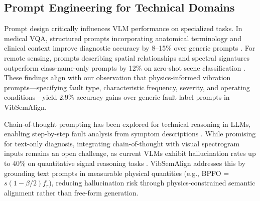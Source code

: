 \subsection{Prompt Engineering for Technical Domains}

Prompt design critically influences VLM performance on specialized tasks. In medical VQA, structured prompts incorporating anatomical terminology and clinical context improve diagnostic accuracy by 8--15\% over generic prompts \cite{li2023llava}. For remote sensing, prompts describing spatial relationships and spectral signatures outperform class-name-only prompts by 12\% on zero-shot scene classification \cite{liu2024remoteclip}. These findings align with our observation that physics-informed vibration prompts—specifying fault type, characteristic frequency, severity, and operating conditions—yield 2.9\% accuracy gains over generic fault-label prompts in VibSemAlign.

Chain-of-thought prompting has been explored for technical reasoning in LLMs, enabling step-by-step fault analysis from symptom descriptions \cite{wei2022chain}. While promising for text-only diagnosis, integrating chain-of-thought with visual spectrogram inputs remains an open challenge, as current VLMs exhibit hallucination rates up to 40\% on quantitative signal reasoning tasks \cite{liu2024faultgpt}. VibSemAlign addresses this by grounding text prompts in measurable physical quantities (e.g., BPFO = $s(1-\beta/2)f_r$), reducing hallucination risk through physics-constrained semantic alignment rather than free-form generation.
